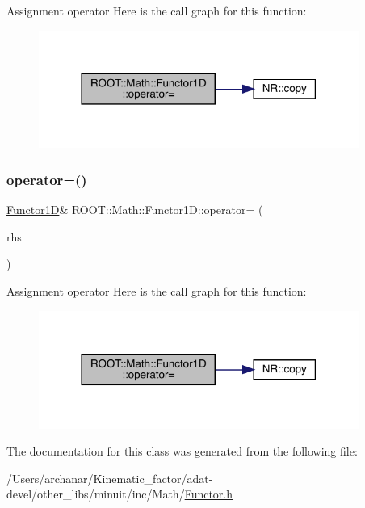 Assignment operator Here is the call graph for this function\+:
\nopagebreak
\begin{figure}[H]
\begin{center}
\leavevmode
\includegraphics[width=297pt]{dc/d6d/classROOT_1_1Math_1_1Functor1D_a723dff64cd3d4e53174624fa56f30a18_cgraph}
\end{center}
\end{figure}
\mbox{\label{classROOT_1_1Math_1_1Functor1D_a723dff64cd3d4e53174624fa56f30a18}} 
\subsubsection{\texorpdfstring{operator=()}{operator=()}\hspace{0.1cm}{\footnotesize\ttfamily [3/3]}}
{\footnotesize\ttfamily \mbox{\hyperlink{classROOT_1_1Math_1_1Functor1D}{Functor1D}}\& R\+O\+O\+T\+::\+Math\+::\+Functor1\+D\+::operator= (\begin{DoxyParamCaption}\item[{const \mbox{\hyperlink{classROOT_1_1Math_1_1Functor1D}{Functor1D}} \&}]{rhs }\end{DoxyParamCaption})\hspace{0.3cm}{\ttfamily [inline]}}

Assignment operator Here is the call graph for this function\+:
\nopagebreak
\begin{figure}[H]
\begin{center}
\leavevmode
\includegraphics[width=297pt]{dc/d6d/classROOT_1_1Math_1_1Functor1D_a723dff64cd3d4e53174624fa56f30a18_cgraph}
\end{center}
\end{figure}


The documentation for this class was generated from the following file\+:\begin{DoxyCompactItemize}
\item 
/\+Users/archanar/\+Kinematic\+\_\+factor/adat-\/devel/other\+\_\+libs/minuit/inc/\+Math/\mbox{\hyperlink{adat-devel_2other__libs_2minuit_2inc_2Math_2Functor_8h}{Functor.\+h}}\end{DoxyCompactItemize}
